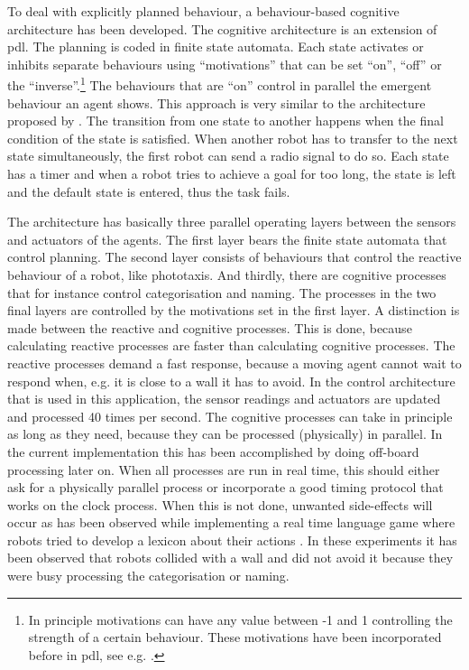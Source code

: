 To deal with explicitly planned behaviour, a behaviour-based cognitive architecture has been developed. The cognitive architecture is an extension of {\sc pdl}. The planning is coded in finite state automata. Each state activates or inhibits separate behaviours using ``motivations'' that can be set ``on'', ``off'' or the ``inverse''.\footnote{In principle motivations can have any value between -1 and 1 controlling the strength of a certain behaviour. These motivations have been incorporated before in {\sc pdl}, see e.g. \citealt{steels:1994,steels:1996c}.} The behaviours that are ``on'' control in parallel the emergent behaviour an agent shows. This approach is very similar to the architecture proposed by \citet{barnesetal:1997}. The transition from one state to another happens when the final condition of the state is satisfied. When another robot has to transfer to the next state simultaneously, the first robot can send a radio signal to do so. Each state has a timer and when a robot tries to achieve a goal for too long, the state is left and the default state is entered, thus the task fails.

The architecture has basically three parallel operating layers between the sensors and actuators of the agents. The first layer bears the finite state automata that control planning. The second layer consists of behaviours that control the reactive behaviour of a robot, like phototaxis. And thirdly, there are cognitive processes that for instance control categorisation and naming. The processes in the two final layers are controlled by the motivations set in the first layer. A distinction is made between the reactive and cognitive processes. This is done, because calculating reactive processes are faster than calculating cognitive processes. The reactive processes demand a fast response, because a moving agent cannot wait to respond when, e.g. it is close to a wall it has to avoid. In the control architecture that is used in this application, the sensor readings and actuators are updated and processed 40 times per second. The cognitive processes can take in principle as long as they need, because they can be processed (physically) in parallel. In the current implementation this has been accomplished by doing off-board processing later on. When all processes are run in real time, this should either ask for a physically parallel process or incorporate a good timing protocol that works on the clock process. When this is not done, unwanted side-effects will occur as has been observed while implementing a real time language game where robots tried to develop a lexicon about their actions \citep{vogt:1999a,vogt:2000}. In these experiments it has been observed that robots collided with a wall and did not avoid it because they were busy processing the categorisation or naming.

